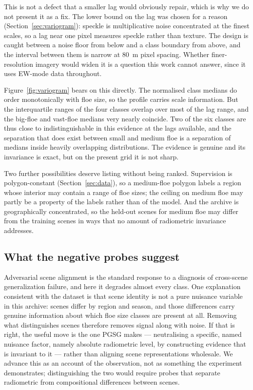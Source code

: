\documentclass[preprint,12pt,authoryear]{elsarticle}
\begin{document}
This is not a defect that a smaller lag would obviously repair, which is why we
do not present it as a fix. The lower bound on the lag was chosen for a reason
(Section~\ref{sec:variogram}): speckle is multiplicative noise concentrated at
the finest scales, so a lag near one pixel measures speckle rather than texture.
The design is caught between a noise floor from below and a class boundary from
above, and the interval between them is narrow at 80~m pixel spacing. Whether
finer-resolution imagery would widen it is a question this work cannot answer,
since it uses EW-mode data throughout.

Figure~\ref{fig:variogram} bears on this directly. The normalised class medians
do order monotonically with floe size, so the profile carries scale information.
But the interquartile ranges of the four classes overlap over most of the lag
range, and the big-floe and vast-floe medians very nearly coincide. Two of the
six classes are thus close to indistinguishable in this evidence at the lags
available, and the separation that does exist between small and medium floe is a
separation of medians inside heavily overlapping distributions. The evidence is
genuine and its invariance is exact, but on the present grid it is not sharp.

Two further possibilities deserve listing without being ranked. Supervision is
polygon-constant (Section~\ref{sec:data}), so a medium-floe polygon labels a
region whose interior may contain a range of floe sizes; the ceiling on medium
floe may partly be a property of the labels rather than of the model. And the
archive is geographically concentrated, so the held-out scenes for medium floe
may differ from the training scenes in ways that no amount of radiometric
invariance addresses.

\subsection{What the negative probes suggest}

Adversarial scene alignment is the standard response to a diagnosis of
cross-scene generalization failure, and here it degrades almost every class. One
explanation consistent with the dataset is that scene identity is not a pure
nuisance variable in this archive: scenes differ by region and season, and those
differences carry genuine information about which floe size classes are present
at all. Removing what distinguishes scenes therefore removes signal along with
noise. If that is right, the useful move is the one PGSG makes --- neutralising
a specific, named nuisance factor, namely absolute radiometric level, by
constructing evidence that is invariant to it --- rather than aligning scene
representations wholesale. We advance this as an account of the observation, not
as something the experiment demonstrates; distinguishing the two would require
probes that separate radiometric from compositional differences between scenes.
\end{document}
